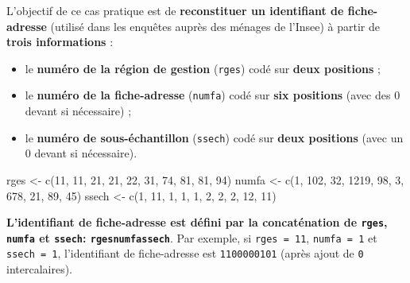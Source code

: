 \documentclass[12pt,twosided, notitlepage]{book}
\newenvironment{Shaded}{}{}
\newcommand{\KeywordTok}[1]{\textcolor[rgb]{0.00,0.00,1.00}{#1}}
\newcommand{\DecValTok}[1]{#1}
\newcommand{\StringTok}[1]{\textcolor[rgb]{0.00,0.50,0.50}{#1}}
\newcommand{\NormalTok}[1]{#1}
\providecommand{\tightlist}{%
  \setlength{\itemsep}{0pt}\setlength{\parskip}{0pt}}
\renewenvironment{Shaded}{\begin{snugshade}}{\end{snugshade}}
\begin{document}
L'objectif de ce cas pratique est de \textbf{reconstituer un identifiant
de fiche-adresse} (utilisé dans les enquêtes auprès des ménages de
l'Insee) à partir de \textbf{trois informations} :

\begin{itemize}
\tightlist
\item
  le \textbf{numéro de la région de gestion} (\texttt{rges}) codé sur
  \textbf{deux positions} ;
\item
  le \textbf{numéro de la fiche-adresse} (\texttt{numfa}) codé sur
  \textbf{six positions} (avec des 0 devant si nécessaire) ;
\item
  le \textbf{numéro de sous-échantillon} (\texttt{ssech}) codé sur
  \textbf{deux positions} (avec un 0 devant si nécessaire).
\end{itemize}

\begin{Shaded}
\begin{Highlighting}[]
\NormalTok{rges <-}\StringTok{ }\KeywordTok{c}\NormalTok{(}\DecValTok{11}\NormalTok{, }\DecValTok{11}\NormalTok{, }\DecValTok{21}\NormalTok{, }\DecValTok{21}\NormalTok{, }\DecValTok{22}\NormalTok{, }\DecValTok{31}\NormalTok{, }\DecValTok{74}\NormalTok{, }\DecValTok{81}\NormalTok{, }\DecValTok{81}\NormalTok{, }\DecValTok{94}\NormalTok{)}
\NormalTok{numfa <-}\StringTok{ }\KeywordTok{c}\NormalTok{(}\DecValTok{1}\NormalTok{, }\DecValTok{102}\NormalTok{, }\DecValTok{32}\NormalTok{, }\DecValTok{1219}\NormalTok{, }\DecValTok{98}\NormalTok{, }\DecValTok{3}\NormalTok{, }\DecValTok{678}\NormalTok{, }\DecValTok{21}\NormalTok{, }\DecValTok{89}\NormalTok{, }\DecValTok{45}\NormalTok{)}
\NormalTok{ssech <-}\StringTok{ }\KeywordTok{c}\NormalTok{(}\DecValTok{1}\NormalTok{, }\DecValTok{11}\NormalTok{, }\DecValTok{1}\NormalTok{, }\DecValTok{1}\NormalTok{, }\DecValTok{1}\NormalTok{, }\DecValTok{2}\NormalTok{, }\DecValTok{2}\NormalTok{, }\DecValTok{2}\NormalTok{, }\DecValTok{12}\NormalTok{, }\DecValTok{11}\NormalTok{)}
\end{Highlighting}
\end{Shaded}

\textbf{L'identifiant de fiche-adresse est défini par la concaténation
de \texttt{rges}, \texttt{numfa} et \texttt{ssech}:
\texttt{rges\textbar{}\textbar{}numfa\textbar{}\textbar{}ssech}}. Par
exemple, si \texttt{rges\ =\ 11}, \texttt{numfa\ =\ 1} et
\texttt{ssech\ =\ 1}, l'identifiant de fiche-adresse est
\texttt{1100000101} (après ajout de \texttt{0} intercalaires).
\end{document}
